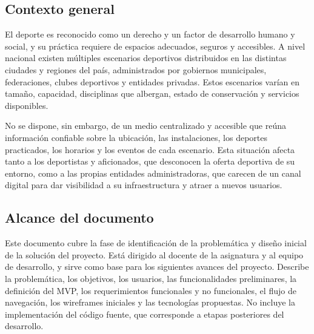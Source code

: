 \subsection{Contexto general}

El deporte es reconocido como un derecho y un factor de desarrollo humano y
social, y su pr\'actica requiere de espacios adecuados, seguros y accesibles. A
nivel nacional existen m\'ultiples escenarios deportivos distribuidos en las
distintas ciudades y regiones del pa\'is, administrados por gobiernos
municipales, federaciones, clubes deportivos y entidades privadas. Estos
escenarios var\'ian en tama\~no, capacidad, disciplinas que albergan, estado de
conservaci\'on y servicios disponibles.

No se dispone, sin embargo, de un medio centralizado y accesible que re\'una
informaci\'on confiable sobre la ubicaci\'on, las instalaciones, los deportes
practicados, los horarios y los eventos de cada escenario. Esta situaci\'on afecta
tanto a los deportistas y aficionados, que desconocen la oferta deportiva de su
entorno, como a las propias entidades administradoras, que carecen de un canal
digital para dar visibilidad a su infraestructura y atraer a nuevos usuarios.

\subsection{Alcance del documento}

Este documento cubre la fase de identificaci\'on de la problem\'atica y dise\~no
inicial de la soluci\'on del proyecto. Est\'a dirigido al docente de la asignatura
y al equipo de desarrollo, y sirve como base para los siguientes avances del
proyecto. Describe la problem\'atica, los objetivos, los usuarios, las
funcionalidades preliminares, la definici\'on del MVP, los requerimientos
funcionales y no funcionales, el flujo de navegaci\'on, los wireframes
iniciales y las tecnolog\'ias propuestas. No incluye la implementaci\'on del
c\'odigo fuente, que corresponde a etapas posteriores del desarrollo.
